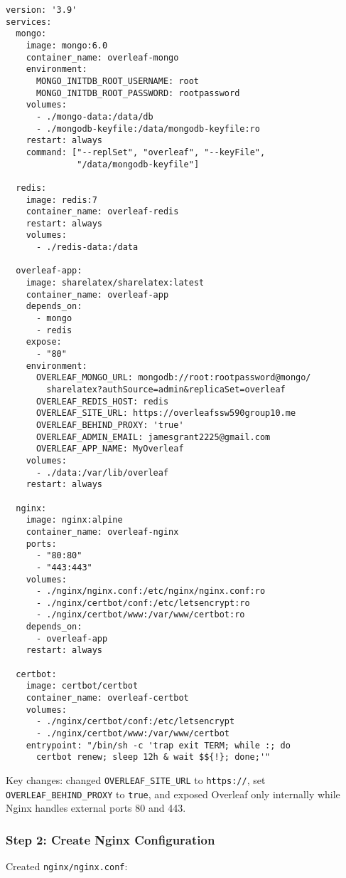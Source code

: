 \begin{verbatim}
version: '3.9'
services:
  mongo:
    image: mongo:6.0
    container_name: overleaf-mongo
    environment:
      MONGO_INITDB_ROOT_USERNAME: root
      MONGO_INITDB_ROOT_PASSWORD: rootpassword
    volumes:
      - ./mongo-data:/data/db
      - ./mongodb-keyfile:/data/mongodb-keyfile:ro
    restart: always
    command: ["--replSet", "overleaf", "--keyFile", 
              "/data/mongodb-keyfile"]

  redis:
    image: redis:7
    container_name: overleaf-redis
    restart: always
    volumes:
      - ./redis-data:/data

  overleaf-app:
    image: sharelatex/sharelatex:latest
    container_name: overleaf-app
    depends_on:
      - mongo
      - redis
    expose:
      - "80"
    environment:
      OVERLEAF_MONGO_URL: mongodb://root:rootpassword@mongo/
        sharelatex?authSource=admin&replicaSet=overleaf
      OVERLEAF_REDIS_HOST: redis
      OVERLEAF_SITE_URL: https://overleafssw590group10.me
      OVERLEAF_BEHIND_PROXY: 'true'
      OVERLEAF_ADMIN_EMAIL: jamesgrant2225@gmail.com
      OVERLEAF_APP_NAME: MyOverleaf
    volumes:
      - ./data:/var/lib/overleaf
    restart: always

  nginx:
    image: nginx:alpine
    container_name: overleaf-nginx
    ports:
      - "80:80"
      - "443:443"
    volumes:
      - ./nginx/nginx.conf:/etc/nginx/nginx.conf:ro
      - ./nginx/certbot/conf:/etc/letsencrypt:ro
      - ./nginx/certbot/www:/var/www/certbot:ro
    depends_on:
      - overleaf-app
    restart: always

  certbot:
    image: certbot/certbot
    container_name: overleaf-certbot
    volumes:
      - ./nginx/certbot/conf:/etc/letsencrypt
      - ./nginx/certbot/www:/var/www/certbot
    entrypoint: "/bin/sh -c 'trap exit TERM; while :; do 
      certbot renew; sleep 12h & wait $${!}; done;'"
\end{verbatim}

Key changes: changed \texttt{OVERLEAF\_SITE\_URL} to \texttt{https://}, set \texttt{OVERLEAF\_BEHIND\_PROXY} to \texttt{true}, and exposed Overleaf only internally while Nginx handles external ports 80 and 443.

\subsubsection{Step 2: Create Nginx Configuration}

Created \texttt{nginx/nginx.conf}:

